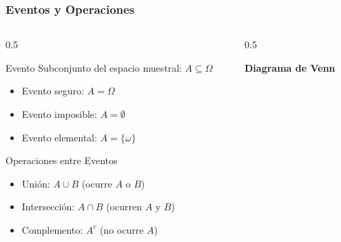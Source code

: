 \documentclass[aspectratio=169,11pt]{beamer}
\begin{document}
\begin{frame}[fragile]
\frametitle{Eventos y Operaciones}

\small
\begin{columns}[T]
\begin{column}{0.5\textwidth}
\begin{block}{Evento}
Subconjunto del espacio muestral: $A \subseteq \Omega$
\end{block}

\pause
\vspace{0.3cm}
\begin{itemize}
  \item Evento seguro: $A = \Omega$
  \item Evento imposible: $A = \emptyset$
  \item Evento elemental: $A = \{\omega\}$
\end{itemize}

\pause
\vspace{0.3cm}
\begin{block}{Operaciones entre Eventos}
\begin{itemize}
  \item Unión: $A \cup B$ (ocurre $A$ o $B$)
  \item Intersección: $A \cap B$ (ocurren $A$ y $B$)
  \item Complemento: $A^c$ (no ocurre $A$)
\end{itemize}
\end{block}
\end{column}

\begin{column}{0.5\textwidth}
\begin{center}
\textbf{Diagrama de Venn}
\pause

\end{center}
\end{column}
\end{columns}
\end{frame}
\end{document}
